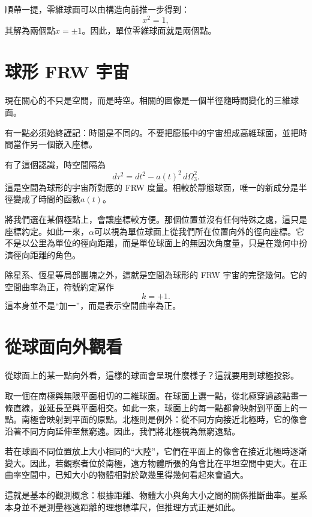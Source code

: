 順帶一提，零維球面可以由構造向前推一步得到：
\begin{equation}
x^2=1,
\end{equation}
其解為兩個點\(x=\pm 1\)。因此，單位零維球面就是兩個點。

\section{球形 FRW 宇宙}

現在關心的不只是空間，而是時空。相關的圖像是一個半徑隨時間變化的三維球面。

有一點必須始終謹記：時間是不同的。不要把膨脹中的宇宙想成高維球面，並把時間當作另一個嵌入座標。

有了這個認識，時空間隔為
\begin{equation}
d\tau^2=dt^2-a(t)^2\,d\Omega_3^2.
\end{equation}
這是空間為球形的宇宙所對應的 FRW 度量。相較於靜態球面，唯一的新成分是半徑變成了時間的函數\(a(t)\)。

將我們選在某個極點上，會讓座標較方便。那個位置並沒有任何特殊之處，這只是座標約定。如此一來，\(\alpha\)可以視為單位球面上從我們所在位置向外的徑向座標。它不是以公里為單位的徑向距離，而是單位球面上的無因次角度量，只是在幾何中扮演徑向距離的角色。

除星系、恆星等局部團塊之外，這就是空間為球形的 FRW 宇宙的完整幾何。它的空間曲率為正，符號約定寫作
\begin{equation}
k=+1.
\end{equation}
這本身並不是``加一''，而是表示空間曲率為正。

\section{從球面向外觀看}

從球面上的某一點向外看，這樣的球面會呈現什麼樣子？這就要用到球極投影。

取一個在南極與無限平面相切的二維球面。在球面上選一點，從北極穿過該點畫一條直線，並延長至與平面相交。如此一來，球面上的每一點都會映射到平面上的一點。南極會映射到平面的原點。北極則是例外：從不同方向接近北極時，它的像會沿著不同方向延伸至無窮遠。因此，我們將北極視為無窮遠點。

若在球面不同位置放上大小相同的``大陸''，它們在平面上的像會在接近北極時逐漸變大。因此，若觀察者位於南極，遠方物體所張的角會比在平坦空間中更大。在正曲率空間中，已知大小的物體相對於歐幾里得幾何看起來會過大。

這就是基本的觀測概念：根據距離、物體大小與角大小之間的關係推斷曲率。星系本身並不是測量極遠距離的理想標準尺，但推理方式正是如此。

